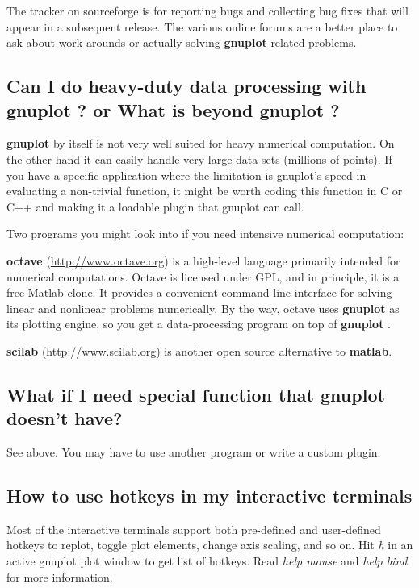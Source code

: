 \documentclass[a4paper,11pt]{article}
\def\http#1{{\small\href{http://#1}{\url{http://#1}}}}
\newcommand{\http}[1]%
            {\htmladdnormallink{\latex{\url{http://#1}}%
                    \html{\textit{http://#1}}}%
                {http://#1}%
            }
\newcommand{\gnuplot}{\textbf{gnuplot }}
\begin{document}
The tracker on sourceforge is for reporting bugs and collecting bug fixes
that will appear in a subsequent release.
The various online forums are a better place to ask about
work arounds or actually solving \gnuplot related problems.

\subsection{Can I do heavy-duty data processing with \gnuplot? or
What is beyond \gnuplot?}

\gnuplot by itself is not very well suited for heavy numerical computation.
On the other hand it can easily handle very large data sets (millions of points).
If you have a specific application where the limitation is gnuplot's speed in
evaluating a non-trivial function, it might be worth coding this function in
C or C++ and making it a loadable plugin that gnuplot can call.

Two programs you might look into if you need intensive numerical computation:

\textbf{octave} (\http{www.octave.org})
is a high-level language primarily intended for numerical computations.
Octave is licensed under GPL, and in principle, it is a free Matlab clone.
It provides a convenient command line interface for solving linear and nonlinear problems
numerically.  By the way, octave uses \gnuplot as its plotting
engine, so you get a data-processing program on top of \gnuplot.

\textbf{scilab} (\http{www.scilab.org}) is another open source alternative to \textbf{matlab}.

\subsection{What if I need special function that gnuplot doesn't have?}

See above. You may have to use another program or write a custom plugin.


\subsection{How to use hotkeys in my interactive terminals}

Most of the interactive terminals support both pre-defined and user-defined
hotkeys to replot, toggle plot elements, change axis scaling, and so on.
Hit \textit{h} in an active gnuplot plot window to get list of hotkeys.
Read \textit{help mouse} and \textit{help bind} for more information.
\end{document}
